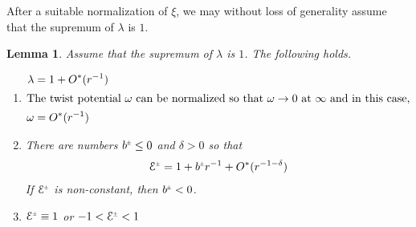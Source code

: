 \documentclass[a4paper,10pt,reqno]{amsart}
\newcommand{\cE}{\mathcal{E}}
\theoremstyle{plain}
\newtheorem{lemma}[thm]{Lemma}
\newcommand{\PM}[1]{{{#1}^{\hspace{-.5pt}\scaleto{\pm}{3.5pt}}}}
\numberwithin{equation}{section}
\begin{document}
After a suitable normalization of $\xi$, we may without loss of generality assume that the supremum of $\lambda$ is $1$. 
\begin{lemma}
Assume that the supremum of $\lambda$ is $1$. The following holds. 
\label{lem:Eprop}  
\begin{enumerate} 
\item \label{point:lmnO*} 
\begin{subequations}\label{eq:lomO*}
\begin{align} 
\lambda ={}& 1 + O^*(r^{-1}) \label{eq:lambdaO*}  \\
\intertext{The twist potential $\omega$ can be normalized so that $\omega \rightarrow 0$ at $\infty$ and in this case,} 
\omega ={}& O^*(r^{-1}) \label{eq:omegaO*} 
\end{align} 
\end{subequations} 
\item \label{point:cE-expand}
There are numbers $\PM{b} \leq 0$ and  $\delta > 0$ so that
\begin{align} \label{eq:cE-expand} 
\PM{\cE} = 1 + \PM{b} r^{-1} + O^*(r^{-1- \delta})
\end{align} 
If $\PM{\cE}$ is non-constant, then $\PM{b} < 0$. 
\item \label{point:cE} 
$\PM{\cE} \equiv 1$ or $-1 < \PM{\cE} < 1$ 
\end{enumerate} 
\end{lemma} 
\end{document}
